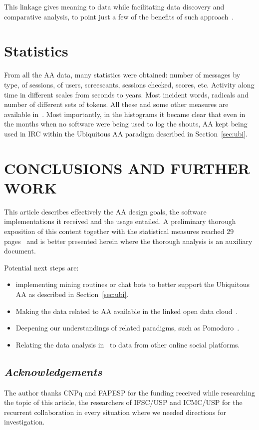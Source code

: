 \documentclass[12pt,fleqn]{article}
\begin{document}
This linkage gives meaning to data while facilitating data discovery and comparative analysis,
to point just a few of the benefits of such approach~\citep{ldb}.

\section{Statistics}\label{sec:stats}
From all the AA data, many statistics were obtained:
number of messages by type, of sessions, of users, screescants, sessions checked, scores, etc.
Activity along time in different scales from seconds to years.
Most incident words, radicals and number of different sets of tokens.
All these and some other measures are available in~\cite{ensaaio}.
Most importantly, in the histograms it became clear that even in the months when no
software were being used to log the shouts, AA kept being used in IRC
within the Ubiquitous AA paradigm described in Section~\ref{sec:ubi}.

\section{CONCLUSIONS AND FURTHER WORK}\label{sec:conc}
This article describes effectively the AA design goals, the software implementations
it received and the usage entailed.
A preliminary thorough exposition of this content together with the statistical measures
reached 29 pages~\citep{ensaaio} and is better presented herein where the thorough analysis
is an auxiliary document.

Potential next steps are:
\begin{itemize}
	\item implementing mining routines or chat bots to better support the Ubiquitous AA
		as described in Section~\ref{sec:ubi}.
	\item Making the data related to AA available in the linked open data cloud~\citep{LOD,losd}.
	\item Deepening our understandings of related paradigms, such as Pomodoro~\citep{pomodoro}.
	\item Relating the data analysis in~\cite{ensaaio} to data from other online social platforms.
\end{itemize}

\subsection*{\textit{Acknowledgements}}
The author thanks CNPq and FAPESP for the funding received while researching the topic of this article,
the researchers of IFSC/USP and ICMC/USP for the recurrent collaboration in every situation
where we needed directions for investigation.
\end{document}
